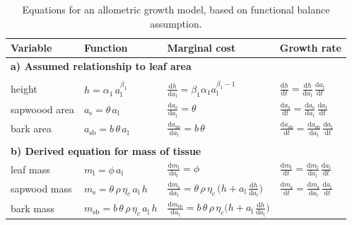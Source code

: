 \documentclass[10pt,twoside]{article}
\begin{document}
\begin{table}[ht]
\caption{Equations for an allometric growth model, based on functional balance assumption. }
\centering
  \begin{tabular}{p{2.5cm}p{3.5cm}p{5cm}p{4cm} }\\ \hline
  Variable & Function & Marginal cost & Growth rate\\ \hline
  \multicolumn{4}{l}{\textbf{a) Assumed relationship to leaf area}} \\ \\
  height &
    $h = \alpha_1 \, a_\textrm{l}^{\beta_1}$ &
    $\frac{\textrm{d}h}{\textrm{d}a_\textrm{l}} =  \beta_1 \alpha_1 a_\textrm{l}^{\beta_1-1}$ &
    $\frac{\textrm{d}h}{\textrm{d}t}  = \frac{\textrm{d}h}{\textrm{d}a_\textrm{l}} \, \frac{\textrm{d}a_\textrm{l}}{\textrm{d}t}$ \\
  sapwoood area &
    $a_\textrm{s} = \theta \, a_\textrm{l}$ &
    $\frac{\textrm{d}a_\textrm{s}}{\textrm{d} a_\textrm{l}} = \theta$ &
    $\frac{\textrm{d}a_\textrm{s}}{\textrm{d}t}  =\frac{\textrm{d}a_\textrm{s}}{\textrm{d} a_\textrm{l}} \, \frac{\textrm{d}a_\textrm{l}}{\textrm{d}t}$ \\
  bark area &
    $a_\textrm{sb} = b \, \theta \, a_\textrm{l}$ &
    $\frac{\textrm{d}a_\textrm{sb}}{\textrm{d} a_\textrm{l}} = b \, \theta$ &
    $\frac{\textrm{d}a_\textrm{sb}}{\textrm{d}t} = \frac{\textrm{d}a_\textrm{sb}}{\textrm{d} a_\textrm{l}} \, \frac{\textrm{d}a_\textrm{l}}{\textrm{d}t}$ \\  \\
  \multicolumn{4}{l}{\textbf{b) Derived equation for mass of tissue }} \\
  leaf mass &
    $m_\textrm{l} = \phi \, a_\textrm{l} $ &
    $\frac{\textrm{d}m_\textrm{l}}{\textrm{d}a_\textrm{l}} = \phi$ &
    $\frac{\textrm{d}m_\textrm{l}}{\textrm{d}t}  = \frac{\textrm{d}m_\textrm{l}}{\textrm{d}a_\textrm{l}}  \, \frac{\textrm{d}a_\textrm{l}}{\textrm{d}t}$ \\
  sapwood mass &
    $m_\textrm{s} = \theta \, \rho \, \eta_c \, a_\textrm{l} \, h $ &
    $\frac{\textrm{d}m_\textrm{s}}{\textrm{d}a_\textrm{l}} = \theta\, \rho\, \eta_c\, \big( h + a_\textrm{l}\, \frac{\textrm{d}h}{\textrm{d}a_\textrm{l}} \big)$ &
    $\frac{\textrm{d}m_\textrm{s}}{\textrm{d}t}  = \frac{\textrm{d}m_\textrm{s}}{\textrm{d}a_\textrm{l}} \, \frac{\textrm{d}a_\textrm{l}}{\textrm{d}t}$ \\
  bark mass &
    $m_\textrm{sb} = b\, \theta \, \rho \, \eta_c \, a_\textrm{l} \, h $ &
    $\frac{\textrm{d}m_\textrm{sb}}{\textrm{d}a_\textrm{l}} = b \, \theta \, \rho \, \eta_c\big( h + a_\textrm{l} \, \frac{\textrm{d}h}{\textrm{d}a_\textrm{l}} \big)$ &

\end{tabular}
\end{table}
\end{document}
